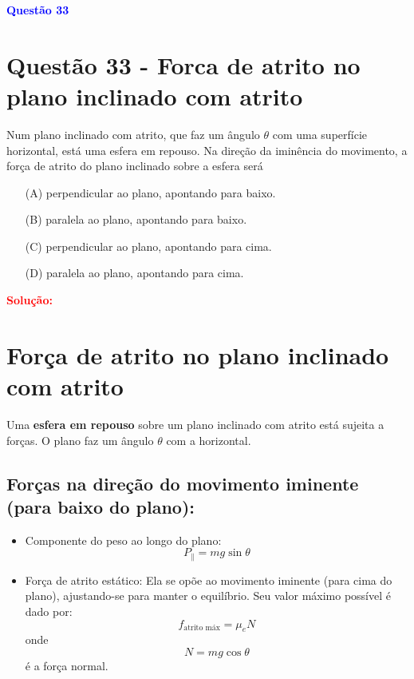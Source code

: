 \documentclass[a4paper,12pt]{article}
\begin{document}
\begin{flushleft}
\textbf{\textcolor{blue}{\Large Quest\~ao 33}}\\
\noindent
\section{Quest\~ao 33 - Forca de atrito no plano inclinado com atrito}
Num plano inclinado com atrito, que faz um ângulo $\theta$ com
uma superfície horizontal, está uma esfera em repouso. Na
direção da iminência do movimento, a força de atrito do
plano inclinado sobre a esfera será

\begin{itemize}
\item[(A)] perpendicular ao plano, apontando para baixo.
\item[(B)] paralela ao plano, apontando para baixo.
\item[(C)] perpendicular ao plano, apontando para cima.
\item[(D)] paralela ao plano, apontando para cima.
\end{itemize}

\vspace{0.5cm}

\textcolor{red}{\textbf{Solução:}}\\

\section*{Força de atrito no plano inclinado com atrito}

Uma \textbf{esfera em repouso} sobre um plano inclinado com atrito está sujeita a forças.  
O plano faz um ângulo \( \theta \) com a horizontal.

\subsection*{Forças na direção do movimento iminente (para baixo do plano):}

\begin{itemize}
  \item Componente do peso ao longo do plano:
  \begin{equation*}
    P_{\parallel} = mg \sin\theta
  \end{equation*}

  \item Força de atrito estático:  
  Ela se opõe ao movimento iminente (para cima do plano), ajustando-se para manter o equilíbrio.  
  Seu valor máximo possível é dado por:
  \begin{equation*}
    f_{\text{atrito máx}} = \mu_e N
  \end{equation*}
  onde
  \begin{equation*}
    N = mg \cos\theta
  \end{equation*}
  é a força normal.
\end{itemize}


\end{flushleft}
\end{document}
